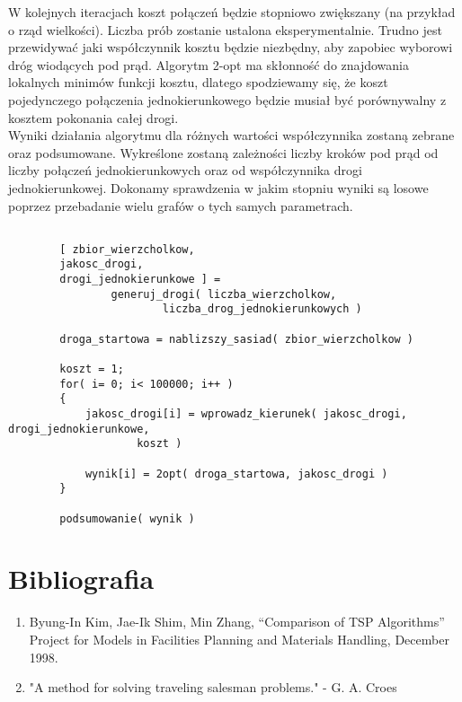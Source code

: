 \documentclass{article}
\begin{document}
W kolejnych iteracjach koszt połączeń będzie stopniowo zwiększany (na przykład o rząd wielkości). Liczba prób zostanie ustalona eksperymentalnie. Trudno jest przewidywać jaki współczynnik kosztu będzie niezbędny, aby zapobiec wyborowi dróg wiodących pod prąd. Algorytm 2-opt ma skłonność do znajdowania lokalnych minimów funkcji kosztu, dlatego spodziewamy się, że koszt pojedynczego połączenia jednokierunkowego będzie musiał być porównywalny z kosztem pokonania całej drogi. \\

Wyniki działania algorytmu dla różnych wartości współczynnika zostaną zebrane oraz podsumowane. Wykreślone zostaną zależności liczby kroków pod prąd od liczby połączeń jednokierunkowych oraz od współczynnika drogi jednokierunkowej. Dokonamy sprawdzenia w jakim stopniu wyniki są losowe poprzez przebadanie wielu grafów o tych samych parametrach. \\

\newpage
\begin{lstlisting}[caption={Funkcja testująca algorytm}]

		[ zbior_wierzcholkow, 
		jakosc_drogi, 
		drogi_jednokierunkowe ] = 
				generuj_drogi( liczba_wierzcholkow, 
						liczba_drog_jednokierunkowych )
		
		droga_startowa = nablizszy_sasiad( zbior_wierzcholkow )
		
		koszt = 1;
		for( i= 0; i< 100000; i++ )
		{
			jakosc_drogi[i] = wprowadz_kierunek( jakosc_drogi, drogi_jednokierunkowe,
					koszt )
			
			wynik[i] = 2opt( droga_startowa, jakosc_drogi )
		}
		
		podsumowanie( wynik )

\end{lstlisting}


\section{Bibliografia}


\begin{enumerate}
\item Byung-In Kim, Jae-Ik Shim, Min Zhang, “Comparison of TSP Algorithms” Project for Models in Facilities Planning and Materials Handling, December 1998. %
\item "A method for solving traveling salesman problems." - G. A. Croes
\end{enumerate}
\end{document}
